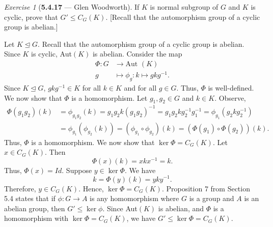 \documentclass[12pt]{amsart}
\makeatletter
\theoremstyle{remark}
\newtheorem*{exercise}{Exercise}%
\renewenvironment{proof}[1][\proofname]{\par\doublespacing
  \pushQED{\qed}%
  \normalfont \topsep6\p@\@plus6\p@\relax
  \list{}{%
    \settowidth{\leftmargin}{\itshape\proofname:\hskip\labelsep}%
    \setlength{\labelwidth}{0pt}%
    \setlength{\itemindent}{-\leftmargin}%
  }%
  \item[\hskip\labelsep\itshape#1\@addpunct{:}]\ignorespaces
}{%
  \popQED\endlist\@endpefalse
  \singlespacing
}
\theoremstyle{mycomment}
\makeatother
\begin{document}
\thispagestyle{fancy}
\author{Coordinator: Glen Woodworth}





\begin{exercise}[\textbf{5.4.17} --- Glen Woodworth] If $K$ is normal subgroup of $G$ and $K$ is cyclic, prove that $G'\le C_G(K)$. [Recall that the automorphism group of a cyclic group is abelian.]
  \begin{proof} Let $K\trianglelefteq G$. Recall that the automorphism group of a cyclic group is abelian. Since $K$ is cyclic, Aut$(K)$ is abelian. Consider the map
  \begin{align*}
  \Phi:G&\rightarrow \text{Aut }(K)\\
  g&\mapsto\phi_g:k\mapsto gkg^{-1}.\end{align*}
  Since $K\trianglelefteq G$, $gkg^{-1}\in K$ for all $k\in K$ and for all $g\in G$. Thus, $\Phi$ is well-defined. We now show that $\Phi$ is a homomorphism. Let $g_1,g_2\in G$ and $k\in K$. Observe,
  \begin{align*}
  \Phi(g_1g_2)(k)&=\phi_{g_1g_2}(k)=g_1g_2k(g_1g_2)^{-1}=g_1g_2kg_2^{-1}g_1^{-1}=\phi_{g_1}(g_2kg_2^{-1})\\
  &=\phi_{g_1}(\phi_{g_2}(k))=(\phi_{g_1}\circ\phi_{g_2})(k)=(\Phi(g_1)\circ\Phi(g_2))(k).
  \end{align*}
Thus, $\Phi$ is a homomorphism. We now show that $\ker\Phi= C_G(K)$. Let $x\in C_G(K)$. Then \[\Phi(x)(k)=xkx^{-1}=k.\]
Thus, $\Phi(x)=Id$. Suppose $y\in\ker\Phi$. We have \[k=\Phi(y)(k)=yky^{-1}.\] Therefore, $y\in C_G(K)$. Hence, $\ker\Phi=C_G(K)$. Proposition 7 from Section 5.4 states that if $\phi:G\rightarrow A$ is any homomorphism where $G$ is a group and $A$ is an abelian group, then $G'\le\ker\phi$. Since Aut$(K)$ is abelian, and $\Phi$ is a homomorphism with $\ker\Phi=C_G(K)$, we have $G'\le\ker\Phi=C_G(K)$.
  \end{proof}
\end{exercise}
\end{document}
